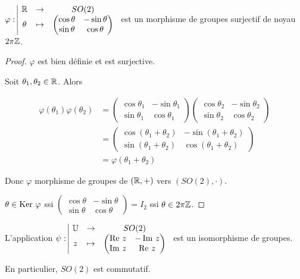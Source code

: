 \begin{theoreme}{}{}
    $\varphi: \space \begin{array}{|ccc} \displaystyle \mathbb{R} & \to & \displaystyle SO(2) \\ \displaystyle \theta & \mapsto & \displaystyle \begin{pmatrix}
        \cos \theta & -\sin \theta \\
        \sin \theta & \cos \theta
    \end{pmatrix} \end{array}$ est un morphisme de groupes surjectif de noyau $2 \pi \mathbb{Z}$.
\end{theoreme}

\begin{proof}
    $\varphi$ est bien définie et est surjective. 

    Soit $\theta_1, \theta_2 \in \mathbb{R}$. Alors 
    
    \begin{align}
        \varphi(\theta_1) \varphi(\theta_2) & = \begin{pmatrix}
        \cos \theta_1 & -\sin \theta_1 \\
        \sin \theta_1 & \cos \theta_1
        \end{pmatrix} \begin{pmatrix}
            \cos \theta_2 & -\sin \theta_2 \\
            \sin \theta_2 & \cos \theta_2
        \end{pmatrix} \\
        & = \begin{pmatrix}
            \cos (\theta_1 + \theta_2) & -\sin (\theta_1 + \theta_2) \\
            \sin (\theta_1 + \theta_2) & \cos (\theta_1 + \theta_2)
        \end{pmatrix} \\
        &  = \varphi(\theta_1 + \theta_2)
    \end{align}

    Donc $\varphi$ morphisme de groupes de $(\mathbb{R}, +)$ vers $(SO(2), \cdot)$.

    $\theta \in \operatorname{Ker} \, \varphi$ ssi $\begin{pmatrix}
        \cos \theta & -\sin \theta \\
        \sin \theta & \cos \theta
    \end{pmatrix} = I_2$ ssi $\theta \in 2 \pi \mathbb{Z}$.
\end{proof}

\begin{theoreme}{}{}
    L'application $\psi: \space \begin{array}{|ccc} \displaystyle \mathbb{U} & \to & \displaystyle SO(2) \\ \displaystyle z & \mapsto & \displaystyle \begin{pmatrix}
        \operatorname{Re} \, z & -\operatorname{Im} \, z \\
        \operatorname{Im} \, z & \operatorname{Re} \, z
    \end{pmatrix} \end{array}$ est un isomorphisme de groupes. 

    En particulier, $SO(2)$ est commutatif. 
\end{theoreme}

